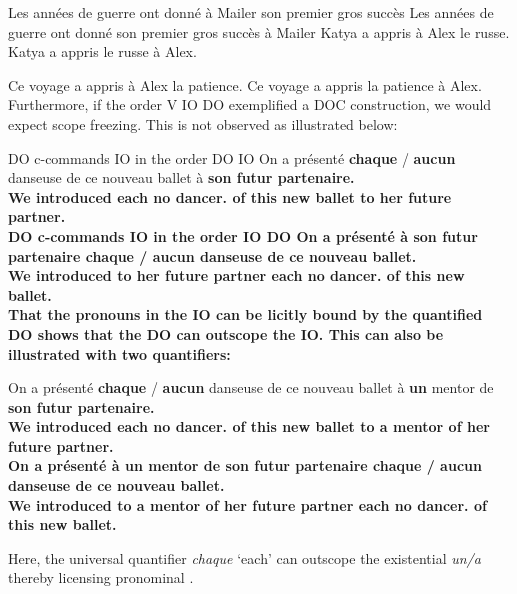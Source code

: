 \documentclass[output=paper]{langsci/langscibook}
\begin{document}
\ea \ea Les ann\'ees de guerre ont donn\'e \`a Mailer son premier gros succ\`es
\ex Les ann\'ees de guerre ont donn\'e son premier gros succ\`es \`a Mailer
\z
\z
\newpage
\ea \ea Katya a appris \`a Alex le russe.
\ex Katya a appris le russe  \`a Alex.
\z
\z

\ea \ea Ce voyage a appris \`a Alex la patience.
\ex Ce voyage a appris la patience  \`a Alex.
\z
\z
%
Furthermore, if the order V IO DO exemplified a \gls{DOC} construction, we
would expect scope freezing. This is not observed as illustrated below:

\ea \label{doio4}
\ea  DO c-commands IO in the order DO IO
\sn
\gll On a  pr\'{e}sent\'{e} {\bf chaque} / {\bf aucun} danseuse de ce nouveau ballet \`{a} \bf{son} futur partenaire.\\
We {} introduced each {} no dancer.\glossF{} of this new ballet to her future partner.\\
\ex  DO c-commands IO in the order IO DO
\sn
\gll On a  pr\'{e}sent\'{e}  \`{a} {\bf son} futur partenaire {\bf chaque} / {\bf aucun} danseuse de ce nouveau ballet.\\
We {} introduced to her future partner each {} no dancer.\glossF{} of this new ballet.\\
\z
\z
%
That the pronouns in the IO can be licitly bound by the quantified DO shows
that the DO can outscope the IO. This can also be illustrated with two
    quantifiers:

\begin{exe}
    \ex\label{ex:key:20.28}%
    \begin{xlist}
    \ex
        \gll On {a  pr\'{e}sent\'{e}} {\bf chaque} / {\bf aucun} danseuse de ce nouveau ballet \`{a} {\bf un} mentor de \bf{son} futur partenaire.\\
        We introduced each {} no dancer.\glossF{} of this new ballet to a mentor of her future partner.\\
        \ex  \gll On {a  pr\'{e}sent\'{e}}  \`{a} {\bf un} mentor de {\bf son} futur partenaire {\bf chaque} / {\bf aucun} danseuse de ce nouveau ballet.\\
        We introduced to a mentor of her future partner each {} no dancer.\glossF{} of this new ballet.\\
    \end{xlist}
\end{exe}
%
Here, the universal quantifier {\it chaque} \enquote*{each} can outscope the
existential {\it un/a} thereby licensing pronominal .
\end{document}
